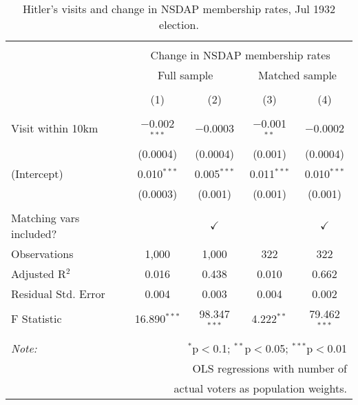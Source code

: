 
\begin{table}[!htbp] \centering 
  \caption{Hitler's visits and change in NSDAP membership rates, Jul 1932 election.} 
  \label{tab:ols-d_p_members-2} 
\begin{tabular}{@{\extracolsep{5pt}}lcccc} 
\\[-1.8ex]\hline 
\hline \\[-1.8ex] 
 & \multicolumn{4}{c}{Change in NSDAP membership rates} \\ 
\cline{2-5} 
 & \multicolumn{2}{c}{Full sample} & \multicolumn{2}{c}{Matched sample} \\ 
\\[-1.8ex] & (1) & (2) & (3) & (4)\\ 
\hline \\[-1.8ex] 
 Visit within 10km & $-$0.002$^{***}$ & $-$0.0003 & $-$0.001$^{**}$ & $-$0.0002 \\ 
  & (0.0004) & (0.0004) & (0.001) & (0.0004) \\ 
  (Intercept) & 0.010$^{***}$ & 0.005$^{***}$ & 0.011$^{***}$ & 0.010$^{***}$ \\ 
  & (0.0003) & (0.001) & (0.001) & (0.001) \\ 
 \hline \\[-1.8ex] 
Matching vars included? &  & \multicolumn{1}{c}{$\checkmark$} &  & \multicolumn{1}{c}{$\checkmark$} \\ 
Observations & 1,000 & 1,000 & 322 & 322 \\ 
Adjusted R$^{2}$ & 0.016 & 0.438 & 0.010 & 0.662 \\ 
Residual Std. Error & 0.004 & 0.003 & 0.004 & 0.002 \\ 
F Statistic & 16.890$^{***}$ & 98.347$^{***}$ & 4.222$^{**}$ & 79.462$^{***}$ \\ 
\hline 
\hline \\[-1.8ex] 
\textit{Note:}  & \multicolumn{4}{r}{$^{*}$p$<$0.1; $^{**}$p$<$0.05; $^{***}$p$<$0.01} \\ 
 & \multicolumn{4}{r}{OLS regressions with number of} \\ 
 & \multicolumn{4}{r}{actual voters as population weights.} \\ 
\end{tabular} 
\end{table} 
